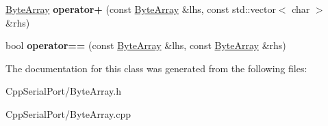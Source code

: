 \begin{DoxyCompactItemize}
\item 
\mbox{\label{class_cpp_serial_port_1_1_byte_array_acb065e9e57edc2b4c1b4c2831dea38bd}} 
\mbox{\hyperlink{class_cpp_serial_port_1_1_byte_array}{Byte\+Array}} {\bfseries operator+} (const \mbox{\hyperlink{class_cpp_serial_port_1_1_byte_array}{Byte\+Array}} \&lhs, const std\+::vector$<$ char $>$ \&rhs)
\item 
\mbox{\label{class_cpp_serial_port_1_1_byte_array_aef2aa19830496269553a5f508f0225de}} 
bool {\bfseries operator==} (const \mbox{\hyperlink{class_cpp_serial_port_1_1_byte_array}{Byte\+Array}} \&lhs, const \mbox{\hyperlink{class_cpp_serial_port_1_1_byte_array}{Byte\+Array}} \&rhs)
\end{DoxyCompactItemize}


The documentation for this class was generated from the following files\+:\begin{DoxyCompactItemize}
\item 
Cpp\+Serial\+Port/Byte\+Array.\+h\item 
Cpp\+Serial\+Port/Byte\+Array.\+cpp\end{DoxyCompactItemize}
